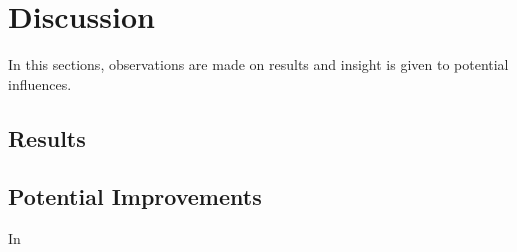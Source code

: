 \documentclass[conference]{IEEEtran}
\begin{document}
\section{Discussion} \label{Discussion}
In this sections, observations are made on results and insight is given to potential influences.

\subsection{Results}




\subsection{Potential Improvements}
In 




\end{document}
